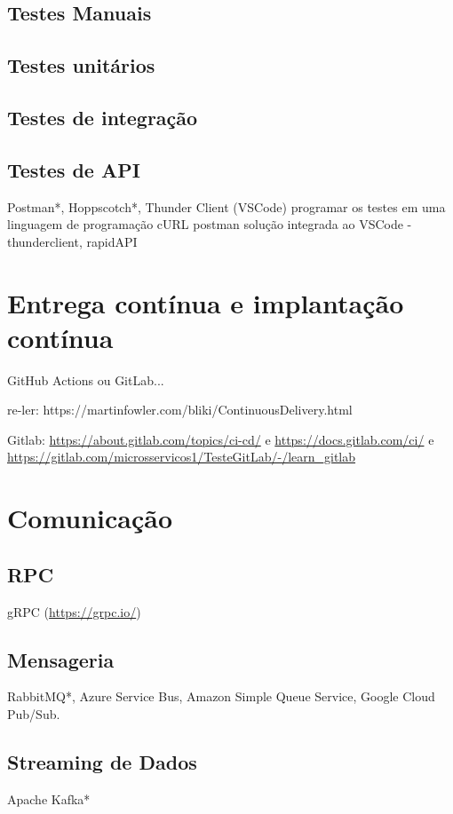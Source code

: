 \subsection{Testes Manuais}
\subsection{Testes unitários}
\subsection{Testes de integração}

\subsection{Testes de API}\label{ferramentas-testes-apis}
Postman*, Hoppscotch*, Thunder Client (VSCode)
programar os testes em uma linguagem de programação
cURL
postman
solução integrada ao VSCode - thunderclient, rapidAPI


\section{Entrega contínua e implantação contínua}
GitHub Actions ou GitLab... 

re-ler: https://martinfowler.com/bliki/ContinuousDelivery.html

Gitlab: \url{https://about.gitlab.com/topics/ci-cd/} e \url{https://docs.gitlab.com/ci/} e \url{https://gitlab.com/microsservicos1/TesteGitLab/-/learn_gitlab}

\section{Comunicação}

\subsection{RPC}
gRPC (\url{https://grpc.io/})

\subsection{Mensageria}
RabbitMQ*, Azure Service Bus, Amazon Simple Queue Service, Google Cloud Pub/Sub.

\subsection{Streaming de Dados}
Apache Kafka*


